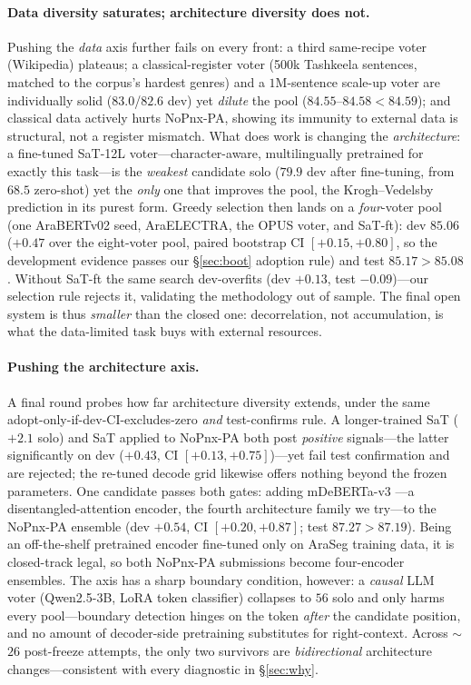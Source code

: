\paragraph{Data diversity saturates; architecture diversity does not.} Pushing the
\emph{data} axis further fails on every front: a third same-recipe voter (Wikipedia)
plateaus; a classical-register voter (500k Tashkeela sentences, matched to the
corpus's hardest genres) and a $1$M-sentence scale-up voter are individually solid
($83.0$/$82.6$ dev) yet \emph{dilute} the pool ($84.55$--$84.58<84.59$); and
classical data actively hurts NoPnx-PA, showing its immunity to external data is
structural, not a register mismatch. What does work is changing the
\emph{architecture}: a fine-tuned SaT-12L \citep{frohmann2024sat} voter---character-aware,
multilingually pretrained for exactly this task---is the \emph{weakest} candidate
solo ($79.9$ dev after fine-tuning, from $68.5$ zero-shot) yet the \emph{only} one
that improves the pool, the Krogh--Vedelsby prediction in its purest form. Greedy
selection then lands on a \emph{four}-voter pool (one AraBERTv02 seed, AraELECTRA,
the OPUS voter, and SaT-ft): dev $85.06$ ($+0.47$ over the eight-voter pool, paired
bootstrap CI $[+0.15,+0.80]$, so the development evidence passes our
\S\ref{sec:boot} adoption rule) and test $85.17{>}85.08$. Without SaT-ft the same
search dev-overfits (dev $+0.13$, test $-0.09$)---our selection rule rejects it,
validating the methodology out of sample. The final open system is thus
\emph{smaller} than the closed one: decorrelation, not accumulation, is what the
data-limited task buys with external resources.

\paragraph{Pushing the architecture axis.} A final round probes how far
architecture diversity extends, under the same adopt-only-if-dev-CI-excludes-zero
\emph{and} test-confirms rule. A longer-trained SaT ($+2.1$ solo) and SaT applied
to NoPnx-PA both post \emph{positive} signals---the latter significantly on dev
($+0.43$, CI $[+0.13,+0.75]$)---yet fail test confirmation and are rejected; the
re-tuned decode grid likewise offers nothing beyond the frozen parameters. One
candidate passes both gates: adding mDeBERTa-v3
\citep{he2021deberta}---a disentangled-attention encoder, the fourth architecture
family we try---to the NoPnx-PA ensemble (dev $+0.54$, CI $[+0.20,+0.87]$; test
$87.27{>}87.19$). Being an off-the-shelf pretrained encoder fine-tuned only on
AraSeg training data, it is closed-track legal, so both NoPnx-PA submissions
become four-encoder ensembles. The axis has a sharp boundary condition, however: a
\emph{causal} LLM voter (Qwen2.5-3B, LoRA token classifier) collapses to $56$
\fone{} solo and only harms every pool---boundary detection hinges on the token
\emph{after} the candidate position, and no amount of decoder-side pretraining
substitutes for right-context. Across $\sim$$26$ post-freeze attempts, the only
two survivors are \emph{bidirectional} architecture changes---consistent with
every diagnostic in \S\ref{sec:why}.

